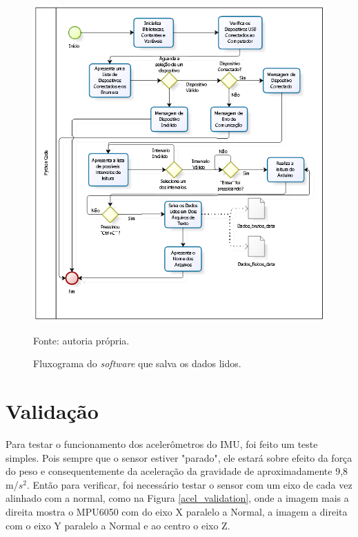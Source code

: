 		
 
		\begin{figure}[h]
			\centering
			\includegraphics[keepaspectratio=true,scale=1]{figuras/diagrama_python.PNG}
			\caption{Fluxograma do \textit{software} que salva os dados lidos. }
			Fonte: autoria própria. 
			\label{fluxograma_python}	
		\end{figure}
		
\section {Validação}

	Para testar o funcionamento dos acelerômetros do IMU, foi feito um teste simples. Pois sempre que o sensor estiver "parado", ele estará sobre efeito da força do peso e consequentemente da aceleração da gravidade de aproximadamente 9,8 m/$ s^2 $. Então para verificar, foi necessário testar o sensor com um eixo de cada vez alinhado com a normal, como na Figura \ref{acel_validation}, onde a imagem mais a direita mostra o MPU6050 com do eixo X paralelo a Normal, a imagem a direita com o eixo Y paralelo a Normal e ao centro o eixo Z.
	
